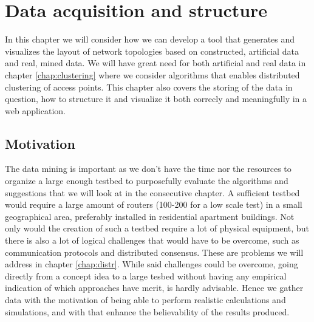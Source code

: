 \chapter{Data acquisition and structure}\label{dataacc}
In this chapter we will consider how we can develop a tool that generates and visualizes the layout of network topologies based on constructed, artificial data and real, mined data.
We will have great need for both artificial and real data in chapter \ref{chap:clustering} where we consider algorithms that enables distributed clustering of access points. This chapter also covers the storing of the data in question, how to structure it and visualize it both correcly and meaningfully in a web application. 

\section{Motivation}
The data mining is important as we don't have the time nor the resources to organize a large enough testbed to purposefully evaluate the algorithms and suggestions that we will look at in the 
consecutive chapter. A sufficient testbed would require a large amount of routers (100-200 for a low scale test) in a small geographical area, preferably installed in 
residential apartment buildings. Not only would the creation of such a testbed require a lot of physical equipment, but there is also a lot of logical challenges 
that would have to be overcome, such as communication protocols and distributed consensus. These are problems we will address in chapter \ref{chap:distr}.
While said challenges could be overcome, going directly from a concept idea to a large tesbed without having any empirical indication of which approaches have merit, is 
hardly advisable. Hence we gather data with the motivation of being able to perform realistic calculations and simulations, and with that enhance the believability of the results produced. 

